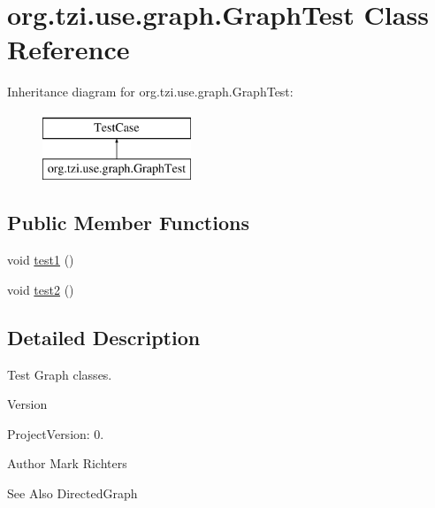 \hypertarget{classorg_1_1tzi_1_1use_1_1graph_1_1_graph_test}{\section{org.\-tzi.\-use.\-graph.\-Graph\-Test Class Reference}
\label{classorg_1_1tzi_1_1use_1_1graph_1_1_graph_test}
}
Inheritance diagram for org.\-tzi.\-use.\-graph.\-Graph\-Test\-:\begin{figure}[H]
\begin{center}
\leavevmode
\includegraphics[height=2.000000cm]{classorg_1_1tzi_1_1use_1_1graph_1_1_graph_test}
\end{center}
\end{figure}
\subsection*{Public Member Functions}
\begin{DoxyCompactItemize}
\item 
void \hyperlink{classorg_1_1tzi_1_1use_1_1graph_1_1_graph_test_a5d7bd3f760b749cba5a417ea0b3ff262}{test1} ()
\item 
void \hyperlink{classorg_1_1tzi_1_1use_1_1graph_1_1_graph_test_af478d7cb55f595d362d6f26c2820cc6e}{test2} ()
\end{DoxyCompactItemize}


\subsection{Detailed Description}
Test Graph classes.

\begin{DoxyVersion}{Version}

\end{DoxyVersion}
\begin{DoxyParagraph}{Project\-Version\-:}
0. 
\end{DoxyParagraph}
\begin{DoxyAuthor}{Author}
Mark Richters 
\end{DoxyAuthor}
\begin{DoxySeeAlso}{See Also}
Directed\-Graph 
\end{DoxySeeAlso}


